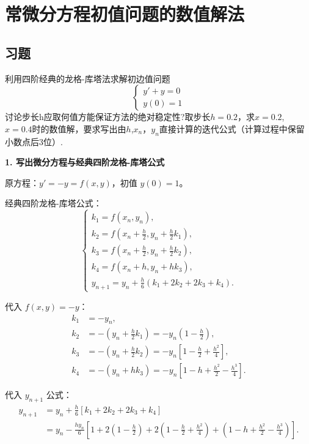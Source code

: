 \documentclass[lang=cn,newtx,12pt,scheme=chinese]{elegantbook}
\begin{document}
\chapter{常微分方程初值问题的数值解法}
\section{习题}
\begin{exercise}
	利用四阶经典的龙格-库塔法求解初边值问题\[ 
	\begin{cases}
		y'+y=0\\
		y(0)=1
	\end{cases}
	\]
	讨论步长h应取何值方能保证方法的绝对稳定性?取步长$h=0.2$，求$x=0.2$, $x=0.4$时的数值解，要求写出由$h$,$x_n$，$y_n$直接计算的迭代公式（计算过程中保留小数点后3位）.
\end{exercise}
\begin{solution}
	\noindent\textbf{1. 写出微分方程与经典四阶龙格-库塔公式}
	
	原方程：$y' = -y = f(x, y)$，初值 $y(0) = 1$。
	
	经典四阶龙格-库塔公式：
	\[
	\begin{cases}
		k_1 = f(x_n, y_n), \\
		k_2 = f\left(x_n + \frac{h}{2}, y_n + \frac{h}{2}k_1\right), \\
		k_3 = f\left(x_n + \frac{h}{2}, y_n + \frac{h}{2}k_2\right), \\
		k_4 = f\left(x_n + h, y_n + h k_3\right), \\
		y_{n+1} = y_n + \frac{h}{6}(k_1 + 2k_2 + 2k_3 + k_4).
	\end{cases}
	\]
	
	代入 $f(x, y) = -y$：
	\[
	\begin{aligned}
		k_1 &= -y_n, \\
		k_2 &= -\left(y_n + \frac{h}{2}k_1\right) = -y_n\left(1 - \frac{h}{2}\right), \\
		k_3 &= -\left(y_n + \frac{h}{2}k_2\right) = -y_n\left[1 - \frac{h}{2} + \frac{h^2}{4}\right], \\
		k_4 &= -\left(y_n + h k_3\right) = -y_n\left[1 - h + \frac{h^2}{2} - \frac{h^3}{4}\right].
	\end{aligned}
	\]
	
	代入 $y_{n+1}$ 公式：
	\[
	\begin{aligned}
		y_{n+1} &= y_n + \frac{h}{6}\left[k_1 + 2k_2 + 2k_3 + k_4\right] \\
		&= y_n - \frac{h y_n}{6}\left[1 + 2\left(1 - \frac{h}{2}\right) + 2\left(1 - \frac{h}{2} + \frac{h^2}{4}\right) + \left(1 - h + \frac{h^2}{2} - \frac{h^3}{4}\right)\right].
	\end{aligned}
	\]
	

\end{solution}
\end{document}

